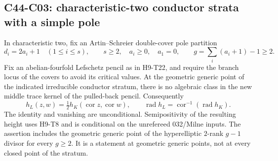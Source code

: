 \subsection{C44-C03: characteristic-two conductor strata with a simple pole}
\begin{theorem}[C44-C03]\label{thm:AS-strata}
In characteristic two, fix an Artin--Schreier double-cover pole partition
\[
 d_i=2a_i+1\quad(1\le i\le s),\qquad
 s\ge2,\quad a_i\ge0,\quad a_1=0,
 \qquad g=\sum_i(a_i+1)-1\ge2.
\]
Fix an abelian-fourfold Lefschetz pencil as in H9-T22, and require the
branch locus of the covers to avoid its critical values. At the geometric
generic point of the indicated irreducible conductor stratum, there is
no algebraic class in the new middle trace kernel of the pulled-back
pencil. Consequently
\[
 h_L(z,w)=\tfrac12h_K(\operatorname{cor}z,\operatorname{cor}w),
 \qquad \operatorname{rad}h_L=
 \operatorname{cor}^{-1}(\operatorname{rad}h_K).
 \tag{C44.C03.1}
\]
The identity and vanishing are unconditional. Semipositivity of the
resulting height uses H9-T8 and is conditional on the unrefereed
032/Milne inputs. The assertion includes the geometric generic point
of the hyperelliptic $2$-rank $g-1$ divisor for every $g\ge2$.
It is a statement at geometric generic points, not at every closed
point of the stratum.
\end{theorem}
